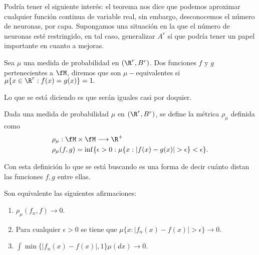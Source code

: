 Podría tener el siguiente interés:
el teorema nos dice que podemos aproximar cualquier función continua de variable real, sin embargo, desconocemos el 
número de neuronas, por capa. Supongamos una situación en la que el número de neuronas esté restringido, en tal caso,
generalizar $A^r$ sí que podría tener un papel importante en cuanto a mejoras. 


\begin{definicion}
    Sea $\mu$ una medida de probabilidad en $(\R^r, B^r)$.  Dos funciones 
    $f$ y $g$ pertenecientes a $\fM$, diremos que son $\mu -$equivalentes 
    si $\mu\{ x \in \R^r : f(x)=g(x) \} = 1.$
\end{definicion}

Lo que se está diciendo es que serán iguales casi por doquier.   

\begin{definicion} 
    Dada una medida de probabilidad $\mu$ en $(\R^r, B^r)$, se define 
    la métrica $\rho_{\mu}$ definida como 
    \begin{equation}
        \begin{split}
            & \rho_{\mu} : \fM \times \fM \longrightarrow \R^+ \\
            & \rho_{\mu}(f,g) = \inf \{ \epsilon > 0: \mu \{ x : |f(x) - g(x)| > \epsilon \} < \epsilon \}.
        \end{split}
    \end{equation}
\end{definicion}  

Con esta definición lo que se está buscando es una forma de decir cuánto 
distan las funciones $f,g$ entre ellas.  

\begin{lema}\label{lema:caracterizacionConvergenciaSucesiones2_1}
    Son equivalente las siguientes afirmaciones: 
    \begin{enumerate}[label=(\roman*)]
        \item $\rho_{\mu}(f_n, f) \longrightarrow 0$.
        \item Para cualquier  $\epsilon > 0$ se tiene que $\mu \{  x : |f_n(x) - f(x)| > \epsilon \} \longrightarrow 0$.
        \item $\int \min \{ |f_n(x) - f(x)|, 1\} \mu(dx) \longrightarrow 0.$
    \end{enumerate}
\end{lema}

